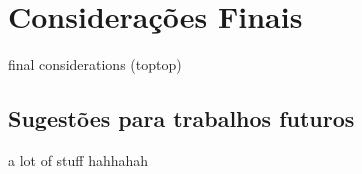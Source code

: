 \chapter{Considerações Finais}

final considerations (toptop)

\section{Sugestões para trabalhos futuros}

a lot of stuff hahhahah
